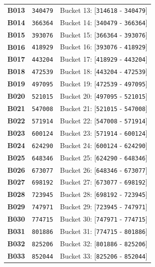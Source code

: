 \documentclass[11pt,a4paper]{article}
\begin{document}
{{\begin{xltabular}{\textwidth}{l | C | C}
\textbf{B013} & \texttt{340479} & Bucket 13: [\texttt{314618} - \texttt{340479}] \\
\textbf{B014} & \texttt{366364} & Bucket 14: [\texttt{340479} - \texttt{366364}] \\
\textbf{B015} & \texttt{393076} & Bucket 15: [\texttt{366364} - \texttt{393076}] \\
\textbf{B016} & \texttt{418929} & Bucket 16: [\texttt{393076} - \texttt{418929}] \\
\textbf{B017} & \texttt{443204} & Bucket 17: [\texttt{418929} - \texttt{443204}] \\
\textbf{B018} & \texttt{472539} & Bucket 18: [\texttt{443204} - \texttt{472539}] \\
\textbf{B019} & \texttt{497095} & Bucket 19: [\texttt{472539} - \texttt{497095}] \\
\textbf{B020} & \texttt{521015} & Bucket 20: [\texttt{497095} - \texttt{521015}] \\
\textbf{B021} & \texttt{547008} & Bucket 21: [\texttt{521015} - \texttt{547008}] \\
\textbf{B022} & \texttt{571914} & Bucket 22: [\texttt{547008} - \texttt{571914}] \\
\textbf{B023} & \texttt{600124} & Bucket 23: [\texttt{571914} - \texttt{600124}] \\
\textbf{B024} & \texttt{624290} & Bucket 24: [\texttt{600124} - \texttt{624290}] \\
\textbf{B025} & \texttt{648346} & Bucket 25: [\texttt{624290} - \texttt{648346}] \\
\textbf{B026} & \texttt{673077} & Bucket 26: [\texttt{648346} - \texttt{673077}] \\
\textbf{B027} & \texttt{698192} & Bucket 27: [\texttt{673077} - \texttt{698192}] \\
\textbf{B028} & \texttt{723945} & Bucket 28: [\texttt{698192} - \texttt{723945}] \\
\textbf{B029} & \texttt{747971} & Bucket 29: [\texttt{723945} - \texttt{747971}] \\
\textbf{B030} & \texttt{774715} & Bucket 30: [\texttt{747971} - \texttt{774715}] \\
\textbf{B031} & \texttt{801886} & Bucket 31: [\texttt{774715} - \texttt{801886}] \\
\textbf{B032} & \texttt{825206} & Bucket 32: [\texttt{801886} - \texttt{825206}] \\
\textbf{B033} & \texttt{852044} & Bucket 33: [\texttt{825206} - \texttt{852044}] \\

\end{xltabular}}}
\end{document}
